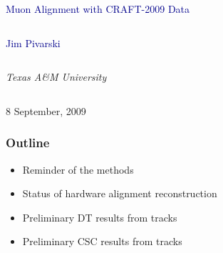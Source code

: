 \documentclass[compress]{beamer}
\begin{document}
\begin{frame}
\vfill
\begin{center}
\textcolor{darkblue}{\Large Muon Alignment with CRAFT-2009 Data}

\vfill
\begin{columns}
\begin{center}
\large
\textcolor{darkblue}{Jim Pivarski}
\end{center}
\end{columns}

\begin{columns}
\begin{center}
\scriptsize
{\it Texas A\&M University}
\end{center}
\end{columns}

\vfill
 8 September, 2009

\end{center}
\end{frame}


\small

\begin{frame}
\frametitle{Outline}
\begin{itemize}\setlength{\itemsep}{0.75 cm}
\item Reminder of the methods
\item Status of hardware alignment reconstruction
\item Preliminary DT results from tracks
\item Preliminary CSC results from tracks
\end{itemize}
\end{frame}
\end{document}
